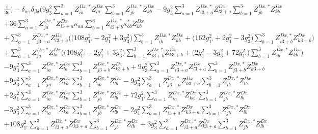 \begin{align} 
 &\frac{i}{36} \Big(- \delta_{\alpha \gamma} \delta_{\beta \delta} \Big(9 g_{3}^{2} \sum_{a=1}^{3}Z^{{Dx},*}_{i a} Z_{{l a}}^{Dx}  \sum_{b=1}^{3}Z^{{Dx},*}_{j b} Z_{{k b}}^{Dx}  -9 g_{3}^{2} \sum_{a=1}^{3}Z^{{Dx},*}_{i 3 + a} Z_{{l 3 + a}}^{Dx}  \sum_{b=1}^{3}Z^{{Dx},*}_{j b} Z_{{k b}}^{Dx}  \nonumber \\ 
 &+36 \sum_{a=1}^{3}Z^{{Dx},*}_{j a} Z_{{l 3 + a}}^{Dx} \kappa_{{a a}}  \sum_{b=1}^{3}Z^{{Dx},*}_{i 3 + b} \kappa^*_{b b} Z_{{k b}}^{Dx}  \nonumber \\ 
 &+\sum_{a=1}^{3}Z^{{Dx},*}_{j 3 + a} Z_{{l 3 + a}}^{Dx}  \Big(\Big(108 g_{1'}^{2}  -2 g_{1}^{2}  + 3 g_{3}^{2} \Big)\sum_{b=1}^{3}Z^{{Dx},*}_{i b} Z_{{k b}}^{Dx}   + \Big(162 g_{1'}^{2}  + 2 g_{1}^{2}  -3 g_{3}^{2} \Big)\sum_{b=1}^{3}Z^{{Dx},*}_{i 3 + b} Z_{{k 3 + b}}^{Dx}  \Big)\nonumber \\ 
 &+\sum_{a=1}^{3}Z^{{Dx},*}_{j a} Z_{{l a}}^{Dx}  \Big(\Big(108 g_{1'}^{2}  -2 g_{1}^{2}  + 3 g_{3}^{2} \Big)\sum_{b=1}^{3}Z^{{Dx},*}_{i 3 + b} Z_{{k 3 + b}}^{Dx}   + \Big(2 g_{1}^{2}  -3 g_{3}^{2}  + 72 g_{1'}^{2} \Big)\sum_{b=1}^{3}Z^{{Dx},*}_{i b} Z_{{k b}}^{Dx}  \Big)\nonumber \\ 
 &-9 g_{3}^{2} \sum_{a=1}^{3}Z^{{Dx},*}_{i a} Z_{{l a}}^{Dx}  \sum_{b=1}^{3}Z^{{Dx},*}_{j 3 + b} Z_{{k 3 + b}}^{Dx}  +9 g_{3}^{2} \sum_{a=1}^{3}Z^{{Dx},*}_{i 3 + a} Z_{{l 3 + a}}^{Dx}  \sum_{b=1}^{3}Z^{{Dx},*}_{j 3 + b} Z_{{k 3 + b}}^{Dx}  \nonumber \\ 
 &+9 g_{3}^{2} \sum_{a=1}^{3}Z^{{Dx},*}_{j a} Z_{{k a}}^{Dx}  \sum_{b=1}^{3}Z^{{Dx},*}_{i b} Z_{{l b}}^{Dx}  -9 g_{3}^{2} \sum_{a=1}^{3}Z^{{Dx},*}_{j 3 + a} Z_{{k 3 + a}}^{Dx}  \sum_{b=1}^{3}Z^{{Dx},*}_{i b} Z_{{l b}}^{Dx}  \nonumber \\ 
 &+2 g_{1}^{2} \sum_{a=1}^{3}Z^{{Dx},*}_{i a} Z_{{k a}}^{Dx}  \sum_{b=1}^{3}Z^{{Dx},*}_{j b} Z_{{l b}}^{Dx}  +72 g_{1'}^{2} \sum_{a=1}^{3}Z^{{Dx},*}_{i a} Z_{{k a}}^{Dx}  \sum_{b=1}^{3}Z^{{Dx},*}_{j b} Z_{{l b}}^{Dx}  \nonumber \\ 
 &-3 g_{3}^{2} \sum_{a=1}^{3}Z^{{Dx},*}_{i a} Z_{{k a}}^{Dx}  \sum_{b=1}^{3}Z^{{Dx},*}_{j b} Z_{{l b}}^{Dx}  -2 g_{1}^{2} \sum_{a=1}^{3}Z^{{Dx},*}_{i 3 + a} Z_{{k 3 + a}}^{Dx}  \sum_{b=1}^{3}Z^{{Dx},*}_{j b} Z_{{l b}}^{Dx}  \nonumber \\ 
 &+108 g_{1'}^{2} \sum_{a=1}^{3}Z^{{Dx},*}_{i 3 + a} Z_{{k 3 + a}}^{Dx}  \sum_{b=1}^{3}Z^{{Dx},*}_{j b} Z_{{l b}}^{Dx}  +3 g_{3}^{2} \sum_{a=1}^{3}Z^{{Dx},*}_{i 3 + a} Z_{{k 3 + a}}^{Dx}  \sum_{b=1}^{3}Z^{{Dx},*}_{j b} Z_{{l b}}^{Dx}  \nonumber \\ 

\end{align}
